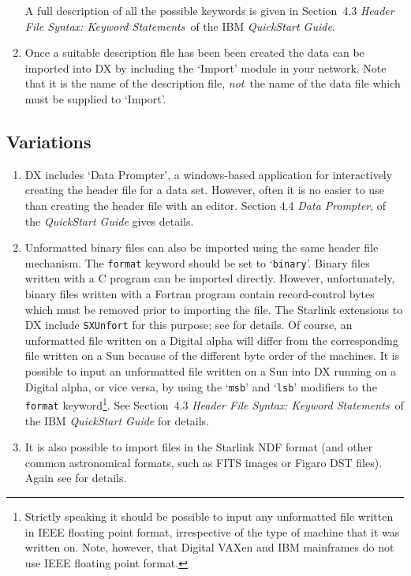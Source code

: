 \documentclass[twoside,11pt]{starlink}
\begin{document}
\begin{enumerate}
\begin{description}
  \end{description}

   A full description of all the possible keywords is given in
   Section~4.3 \textit{Header File Syntax: Keyword Statements}\, of the
   IBM \textit{QuickStart Guide}\cite{QUICKS}.

  \item Once a suitable description file has been been created the data
   can be imported into DX by including the `Import' module in your
   network. Note that it is the name of the description file, \textit{not}\,
   the name of the data file which must be supplied to `Import'.

\end{enumerate}

\subsection{Variations}

\begin{enumerate}

  \item DX includes `Data Prompter', a windows-based application for
   interactively creating the header file for a data set. However, often
   it is no easier to use than creating the header file with an editor.
   Section 4.4 \textit{Data Prompter}, of the \textit{QuickStart
   Guide}\cite{QUICKS} gives details.

  \latex{\newpage}
  \item Unformatted binary files can also be imported using the same
   header file mechanism. The \texttt{format} keyword should be set to
   `\texttt{binary}'. Binary files written with a C program can be
   imported directly. However, unfortunately, binary files  written with
   a Fortran program contain record-control bytes which must be
   removed prior to importing the file. The Starlink extensions to DX
   include \texttt{SXUnfort} for this purpose; see
   \cite{SUN203} for details. Of course, an
   unformatted file written on a Digital alpha will differ from the
   corresponding file written on a Sun because of the different byte
   order of the machines. It is possible to input an unformatted file
   written on a Sun into DX running on a Digital alpha, or vice versa, by
   using the `\texttt{msb}' and `\texttt{lsb}' modifiers to the \texttt{format}
   keyword\footnote{Strictly speaking it should be possible to input any
   unformatted file written in IEEE floating point format, irrespective
   of the type of machine that it was written on. Note, however, that
   Digital VAXen and IBM mainframes do not use IEEE floating point format.}.
   See Section~4.3 \textit{Header File Syntax: Keyword Statements}\, of the
   IBM \textit{QuickStart Guide}\cite{QUICKS} for details.

  \item It is also possible to import files in the Starlink NDF format
   (and other common astronomical formats, such as FITS images or Figaro
   DST files). Again see \cite{SUN203} for details.

\end{enumerate}
\end{document}
